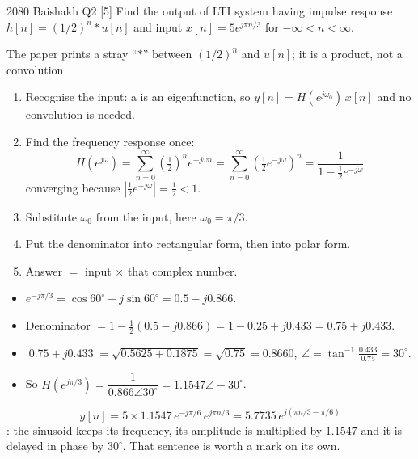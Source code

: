\begin{asked}{2080 Baishakh \textperiodcentered{} Q2 \textperiodcentered{} [5]}
Find the output of LTI system having impulse response $h[n]=(1/2)^n*u[n]$ and input
$x[n]=5e^{j\pi n/3}$ for $-\infty<n<\infty$.
\end{asked}
{\color{sub}\footnotesize The paper prints a stray ``$*$'' between $(1/2)^n$ and $u[n]$; it is
a product, not a convolution.}

\begin{enumerate}
  \item Recognise the input: a  is an
        eigenfunction, so $y[n]=H(e^{j\omega_0})\,x[n]$ and no convolution is needed.
  \item Find the frequency response once:
        \[ H(e^{j\omega})=\sum_{n=0}^{\infty}\left(\tfrac12\right)^ne^{-j\omega n}
          =\sum_{n=0}^{\infty}\left(\tfrac12 e^{-j\omega}\right)^n
          =\frac{1}{1-\frac12e^{-j\omega}} \]
        converging because $|\frac12e^{-j\omega}|=\frac12<1$.
  \item Substitute $\omega_0$ from the input, here $\omega_0=\pi/3$.
  \item Put the denominator into rectangular form, then into polar form.
  \item Answer $=$ input $\times$ that complex number.
\end{enumerate}

\begin{itemize}
  \item $e^{-j\pi/3}=\cos60^\circ-j\sin60^\circ=0.5-j0.866$.
  \item Denominator $=1-\frac12(0.5-j0.866)=1-0.25+j0.433=0.75+j0.433$.
  \item $|0.75+j0.433|=\sqrt{0.5625+0.1875}=\sqrt{0.75}=0.8660$, \quad
        $\angle=\tan^{-1}\!\frac{0.433}{0.75}=30^\circ$.
  \item So $H(e^{j\pi/3})=\dfrac{1}{0.866\angle30^\circ}=1.1547\angle-30^\circ$.
\end{itemize}
\[ \boxed{\;y[n]=5\times1.1547\,e^{-j\pi/6}\,e^{j\pi n/3}
   =5.7735\,e^{j(\pi n/3-\pi/6)}\;} \]
{\color{sub}\footnotesize {}: the sinusoid keeps its frequency, its
amplitude is multiplied by $1.1547$ and it is delayed in phase by $30^\circ$. That sentence is
worth a mark on its own.}

